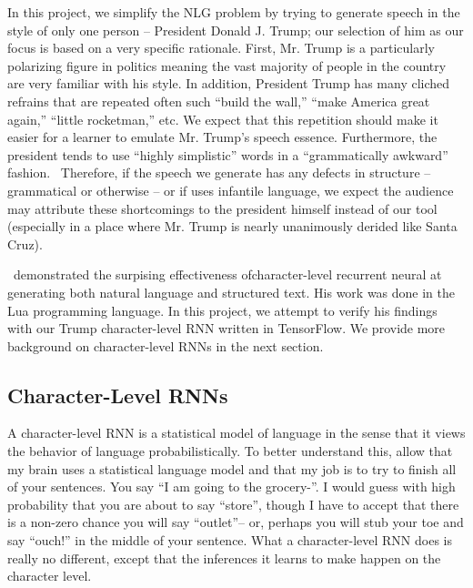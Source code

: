 \documentclass{article}
\begin{document}
In this project, we simplify the NLG problem by trying to generate speech in the style of only one person -- President Donald J. Trump; our selection of him as our focus is based on a very specific rationale.  First, Mr. Trump is a particularly polarizing figure in politics meaning the vast majority of people in the country are very familiar with his style.  In addition, President Trump has many cliched refrains that are repeated often such ``build the wall,'' ``make America great again,'' ``little rocketman,'' etc. We expect that this repetition should make it easier for a learner to emulate Mr. Trump's speech essence.  Furthermore, the president tends to use ``highly simplistic'' words in a ``grammatically awkward'' fashion.~\cite{goldhill2017}  Therefore, if the speech we generate has any defects in structure -- grammatical or otherwise -- or if uses infantile language, we expect the audience may attribute these shortcomings to the president himself instead of our tool (especially in a place where Mr. Trump is nearly unanimously derided like Santa Cruz).

\cite{karapathy2015}~demonstrated the surpising effectiveness ofcharacter-level recurrent neural at generating both natural language and structured text. His work was done in the Lua programming language.  In this project, we attempt to verify his findings with our Trump character-level RNN written in TensorFlow.  We provide more background on character-level RNNs in the next section.


\subsection{Character-Level RNNs}

A character-level RNN is a statistical model of language in the sense that it views the behavior of language probabilistically. To better understand this, allow that my brain uses a statistical language model and that my job is to try to finish all of your sentences. You say ``I am going to the grocery-''. I would guess with high probability that you are about to say ``store'', though I have to accept that there is a non-zero chance you will say ``outlet''-- or, perhaps you will stub your toe and say ``ouch!'' in the middle of your sentence. What a character-level RNN does is really no different, except that the inferences it learns to make happen on the character level.
\end{document}

